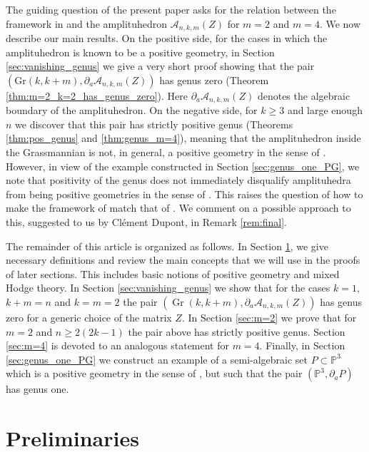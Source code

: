 \documentclass[12pt]{extarticle}
\theoremstyle{definition}
\theoremstyle{theorem}
\theoremstyle{remark}
\numberwithin{equation}{section}
\newcommand{\PP}{\mathbb{P}}
\DeclareMathOperator{\gr}{Gr}
\begin{document}
The guiding question of the present paper asks for the relation between the framework in \cite{brown-dupont} and the amplituhedron $\mathcal{A}_{n,k,m}(Z)$ for $m=2$ and $m=4$. We now describe our main results. 
On the positive side, for the cases in which the amplituhedron is known to be a positive geometry, in Section \ref{sec:vanishing_genus} we give a very short proof showing that the pair $(\mathrm{Gr}(k,k+m),\partial_a \mathcal{A}_{n,k,m}(Z))$ has genus zero (Theorem \ref{thm:m=2_k=2_has_genus_zero}). 
Here $\partial_a \mathcal{A}_{n,k,m}(Z)$ denotes the algebraic boundary of the amplituhedron. 
On the negative side, for $k\geq 3$ and large enough $n$ we discover that this pair has strictly positive genus (Theorems \ref{thm:pos_genus} and \ref{thm:genus_m=4}), meaning that the amplituhedron inside the Grassmannian is not, in general, a positive geometry in the sense of \cite[Definition 1.13]{telen2025positivegeometrypolytopespolypols}.
However, in view of the example constructed in Section \ref{sec:genus_one_PG}, we note that positivity of the genus does not immediately disqualify amplituhedra from being positive geometries in the sense of \cite{pos_geom_2017}. This raises the question of how to make the framework of \cite{brown-dupont} match that of \cite{pos_geom_2017}. We comment on a possible approach to this, suggested to us by Cl\'ement Dupont, in Remark \ref{rem:final}.

The remainder of this article is organized as follows. In Section \ref{sec:prelim}, we give necessary definitions and review the main concepts that we will use in the proofs of later sections.
This includes basic notions of positive geometry and mixed Hodge theory.
In Section \ref{sec:vanishing_genus} we show that for the cases $k=1$, $k+m=n$ and $k=m=2$ the pair $(\gr(k,k+m), \partial_a \mathcal{A}_{n,k,m}(Z))$ has genus zero for a generic choice of the matrix $Z$.
In Section \ref{sec:m=2} we prove that for $m=2$ and $n\geq 2(2k-1)$ the pair above has strictly positive genus. Section \ref{sec:m=4} is devoted to an analogous statement for $m=4$.
Finally, in Section \ref{sec:genus_one_PG} we construct an example of a semi-algebraic set $P\subset \PP^3$ which is a positive geometry in the sense of \cite{pos_geom_2017}, but such that the pair $(\PP^3,\partial_aP)$ has genus one.

\section{Preliminaries} \label{sec:prelim}
\end{document}
